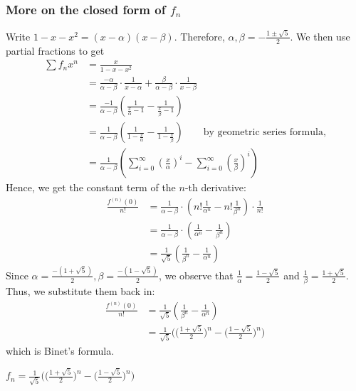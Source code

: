\documentclass[12pt]{article}
\begin{document}
\subsubsection{More on the closed form of $f_n$}
Write $1-x-x^2=(x-\alpha)(x-\beta)$. 
Therefore, $\alpha,\beta=-\frac{1\pm \sqrt{5}}{2}$. We then use partial fractions to get \begin{align*}
    \sum f_nx^n &=\frac{x}{1-x-x^2}\\
    &= \frac{-\alpha}{\alpha-\beta}\cdot \frac{1}{x-\alpha}+\frac{\beta}{\alpha-\beta}\cdot \frac{1}{x-\beta}\\
    &= \frac{-1}{\alpha-\beta}\left(\frac{1}{\frac{x}{\alpha}-1}-\frac{1}{\frac{x}{\beta}-1}\right)\\
    &= \frac{1}{\alpha-\beta}\left(\frac{1}{1-\frac{x}{\alpha}}-\frac{1}{1-\frac{x}{\beta}}\right)\qquad \text{by geometric series formula,}\\
    &= \frac{1}{\alpha-\beta}\left(\sum_{i=0}^{\infty}\left(\frac{x}{\alpha}\right)^i-\sum_{i=0}^{\infty}\left(\frac{x}{\beta}\right)^i\right)
\end{align*}
Hence, we get the constant term of the $n$-th derivative:
	\begin{align*}
		\frac{f^{(n)}(0)}{n!} &= \frac{1}{\alpha-\beta}\cdot \left(n!\frac{1}{\alpha^n}-n!\frac{1}{\beta^n}\right)\cdot \frac{1}{n!}\\
		&= \frac{1}{\alpha-\beta}\cdot \left(\frac{1}{\alpha^n}-\frac{1}{\beta^n}\right)\\
		&=\frac{1}{\sqrt{5}}\left(\frac{1}{\beta^n}-\frac{1}{\alpha^n}\right)
	\end{align*}
	Since $\alpha=\frac{-(1+\sqrt{5})}{2}, \beta=\frac{-(1-\sqrt{5})}{2}$, we observe that $\frac{1}{\alpha}=\frac{1-\sqrt{5}}{2}$ and $\frac{1}{\beta}=\frac{1+\sqrt{5}}{2}$. Thus, we substitute them back in:
	\begin{align*}
		\frac{f^{(n)}(0)}{n!} &= \frac{1}{\sqrt{5}}\left(\frac{1}{\beta^n}-\frac{1}{\alpha^n}\right)\\
		&=\frac{1}{\sqrt{5}} \bigg( \bigg( \frac{1 + \sqrt{5}}{2}\bigg)^n - \bigg( \frac{1 - \sqrt{5}}{2}\bigg)^n \bigg)
	\end{align*}
	which is Binet's formula.

\begin{theorem}
    $\displaystyle
				f_n = \frac{1}{\sqrt{5}} \bigg( \bigg( \frac{1 + \sqrt{5}}{2}\bigg)^n - \bigg( \frac{1 - \sqrt{5}}{2}\bigg)^n \bigg)$
\end{theorem}
\end{document}
